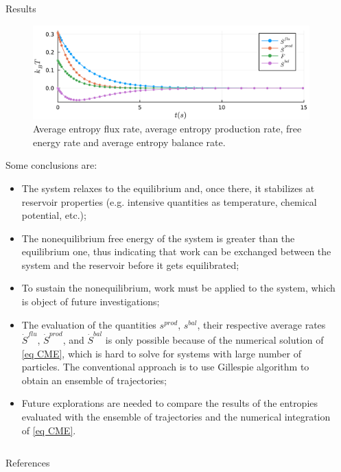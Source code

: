 \documentclass[final]{beamer}
\newlength{\sepwidth}
\newlength{\colwidth}
\newcommand{\separatorcolumn}{\begin{column}{\sepwidth}\end{column}}
\begin{document}
\begin{frame}[t]
\begin{columns}[t]
\begin{column}{\colwidth}
\begin{block}{Results}
\begin{figure}
\begin{center}
%
\includegraphics[scale=1.2]{graphics/f2.pdf}
\end{center}
\label{fig 2-state-system}
\caption{\justifying Average entropy flux rate, average entropy production rate, free energy rate and average entropy balance rate.}
\end{figure}

Some conclusions are:
%
\begin{itemize}
\justifying
\item The system relaxes to the equilibrium and, once there, it stabilizes at reservoir properties (e.g. intensive quantities as temperature, chemical potential, etc.);
\item The nonequilibrium free energy of the system is greater than the equilibrium one, thus indicating that work can be exchanged between the system and the reservoir before it gets equilibrated;
\item To sustain the nonequilibrium, work must be applied to the system, which is object of future investigations;
\item The evaluation of the quantities $s^{prod}$, $s^{bal}$, their respective average rates $\dot{S}^{flu}$, $\dot{S}^{prod}$, and $\dot{S}^{bal}$ is only possible because of the numerical solution of \eqref{eq CME}, which is hard to solve for systems with large number of particles. The conventional approach is to use Gillespie algorithm to obtain an ensemble of trajectories;
\item Future explorations are needed to compare the results of the entropies evaluated with the ensemble of trajectories and the numerical integration of \eqref{eq CME}.
\end{itemize}


\end{block}
\end{column}

\separatorcolumn
\end{columns}
\begin{alertblock}{References}

\begin{minipage}[t][10cm][t]{\textwidth}
\begin{multicols}{4}
\footnotesize{
}
\end{multicols}
\end{minipage}

\end{alertblock}
 \end{frame}
\end{document}
